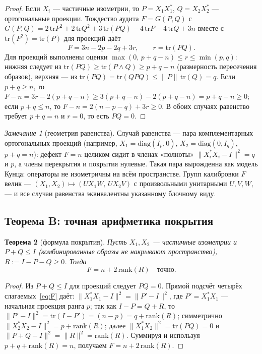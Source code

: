 \documentclass[11pt,a4paper]{article}
\newtheorem{theorem}{Теорема}[section]
\theoremstyle{definition}
\theoremstyle{remark}
\newtheorem{remark}[theorem]{Замечание}
\begin{document}
\begin{proof}
Если $X_i$ --- частичные изометрии, то $P = X_1X_1^*$, $Q = X_2X_2^*$ ---
ортогональные проекции. Тождество аудита $F = G(P,Q)$ с
$G(P,Q) = 2\,\mathrm{tr}P^2 + 2\,\mathrm{tr}Q^2 + 3\,\mathrm{tr}(PQ)
- 4\,\mathrm{tr}P - 4\,\mathrm{tr}Q + 3n$ вместе с $\mathrm{tr}(P^2) =
\mathrm{tr}(P)$ для проекций даёт
\begin{equation}\label{eq:Fproj}
F = 3n - 2p - 2q + 3r, \qquad r = \mathrm{tr}(PQ).
\end{equation}
Для проекций выполнены оценки
$\max(0,\, p + q - n) \le r \le \min(p, q)$:
нижняя следует из $\mathrm{tr}(PQ) \ge \mathrm{tr}(P \wedge Q) \ge p + q - n$
(размерность пересечения образов), верхняя --- из $\mathrm{tr}(PQ) =
\mathrm{tr}(QPQ) \le \|P\|\,\mathrm{tr}(Q) = q$. Если $p + q \ge n$, то
$F - n = 3r - 2(p+q-n) \ge 3(p+q-n) - 2(p+q-n) = p+q-n \ge 0$; если
$p + q \le n$, то $F - n = 2(n - p - q) + 3r \ge 0$. В обоих случаях
равенство требует $p + q = n$ и $r = 0$, то есть $PQ = 0$.
\end{proof}

\begin{remark}[геометрия равенства]\label{rem:equality}
Случай равенства --- пара комплементарных ортогональных проекций
(например, $X_1 = \mathrm{diag}(I_p, 0)$, $X_2 = \mathrm{diag}(0, I_q)$,
$p + q = n$): дефект $F = n$ целиком сидит в членах «полноты»
$\|X_i^*X_i - I\|^2 = q$ и $p$, а члены перекрытия и покрытия нулевые.
Такая пара вырожденна как модель Кунца: операторы не изометричны на всём
пространстве. Групп калибровки $F$ велик --- $(X_1, X_2) \mapsto
(UX_1W,\, UX_2V)$ с произвольными унитарными $U, V, W$, --- и все случаи
равенства эквивалентны указанному блочному виду.
\end{remark}

\subsection{Теорема B: точная арифметика покрытия}

\begin{theorem}[формула покрытия]\label{thm:B}
Пусть $X_1, X_2$ --- частичные изометрии и $P + Q \le I$ (комбинированные
образы не накрывают пространство), $R := I - P - Q \ge 0$. Тогда
\begin{equation}\label{eq:thmB}
F = n + 2\,\mathrm{rank}(R) \quad \text{точно.}
\end{equation}
\end{theorem}
\begin{proof}
Из $P + Q \le I$ для проекций следует $PQ = 0$. Прямой подсчёт четырёх
слагаемых~\eqref{eq:F} даёт: $\|X_1^*X_1 - I\|^2 = \|P' - I\|^2$, где
$P' = X_1^*X_1$ --- начальная проекция ранга $p$; так как $I - P = Q + R$,
то $\|P' - I\|^2 = \mathrm{tr}(I - P') = (n - p) = q + \mathrm{rank}(R)$;
симметрично $\|X_2^*X_2 - I\|^2 = p + \mathrm{rank}(R)$; далее
$\|X_1^*X_2\|^2 = \mathrm{tr}(PQ) = 0$ и $\|P + Q - I\|^2 = \|R\|^2 =
\mathrm{rank}(R)$. Суммируя и используя $p + q + \mathrm{rank}(R) = n$,
получаем $F = n + 2\,\mathrm{rank}(R)$.
\end{proof}
\end{document}
